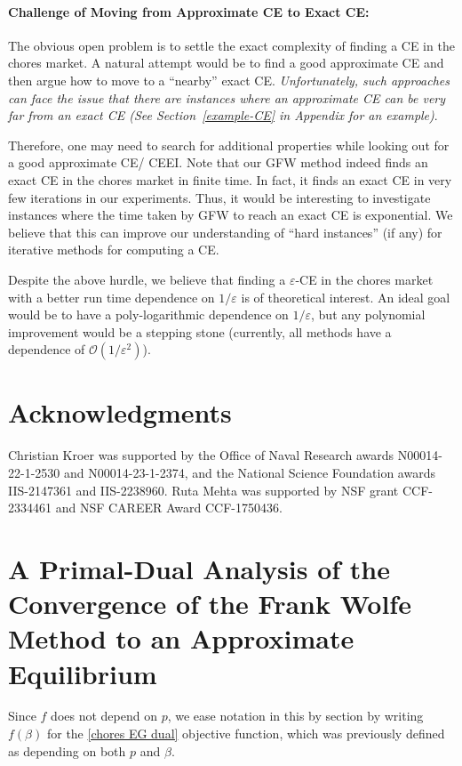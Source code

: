 \documentclass[format=acmsmall,authorversion]{acmart}
\begin{document}
\paragraph{Challenge of Moving from Approximate CE to Exact CE:} The obvious open problem is to settle the exact complexity of finding a CE in the chores market. A natural attempt would be to find a good approximate CE  and then argue how to move to a ``nearby'' exact CE. \emph{Unfortunately, such approaches can face the issue that there are instances where an approximate CE can be very far from an exact CE (See Section~\ref{example-CE} in Appendix for an example)}. 

Therefore, one may need to search for additional properties while looking out for a good approximate CE/ CEEI. Note that our GFW method indeed finds an exact CE in the chores market in finite time. In fact, it finds an exact CE in very few iterations in our experiments. Thus, it would be interesting to investigate instances where the time taken by GFW to reach an exact CE is exponential. We believe that this can improve our understanding of ``hard instances'' (if any) for iterative methods for computing a CE.

Despite the above hurdle, we believe that finding a $\varepsilon$-CE in the chores market with a better run time dependence on $1/\varepsilon$ is of theoretical interest. An ideal goal would be to have a poly-logarithmic dependence on $1/\varepsilon$, but any polynomial improvement would be a stepping stone (currently, all methods have a dependence of $\mathcal{O}(1/\varepsilon^2)$). 

\section*{Acknowledgments}
Christian Kroer was supported by the Office of Naval Research awards N00014-22-1-2530 and N00014-23-1-2374, and the National Science Foundation awards IIS-2147361 and IIS-2238960. Ruta Mehta was supported by NSF grant CCF-2334461 and NSF CAREER Award CCF-1750436. 

  
 

\appendix
\section{A Primal-Dual Analysis of the Convergence of the Frank Wolfe Method to an Approximate Equilibrium}
\label{sec:primal-dual-convergence}
Since $f$ does not depend on $p$, we ease notation in this by section by writing $f(\beta)$ for the \ref{chores EG dual} objective function, which was previously defined as depending on both $p$ and $\beta$. 
\end{document}

